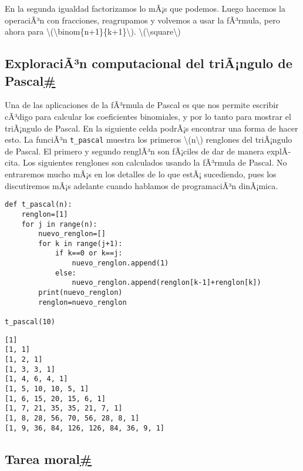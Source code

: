 \documentclass[
]{article}
\begin{document}
En la segunda igualdad factorizamos lo mÃ¡s que podemos. Luego hacemos
la operaciÃ³n con fracciones, reagrupamos y volvemos a usar la fÃ³rmula,
pero ahora para
{\textbackslash(\textbackslash binom\{n+1\}\{k+1\}\textbackslash)}.
{{\textbackslash(\textbackslash square\textbackslash)}}

\label{exploracion-computacional-del-triangulo-de-pascal}
\subsection{\texorpdfstring{ExploraciÃ³n computacional del triÃ¡ngulo de
Pascal\hyperref[exploracion-computacional-del-triangulo-de-pascal]{\#}}{ExploraciÃ³n computacional del triÃ¡ngulo de Pascal\#}}\label{exploraciuxe3uxb3n-computacional-del-triuxe3ngulo-de-pascal}

Una de las aplicaciones de la fÃ³rmula de Pascal es que nos permite
escribir cÃ³digo para calcular los coeficientes binomiales, y por lo
tanto para mostrar el triÃ¡ngulo de Pascal. En la siguiente celda
podrÃ¡s encontrar una forma de hacer esto. La funciÃ³n
{\texttt{t\_pascal}} muestra los primeros
{\textbackslash(n\textbackslash)} renglones del triÃ¡ngulo de Pascal. El
primero y segundo renglÃ³n son fÃ¡ciles de dar de manera explÃ­cita. Los
siguientes renglones son calculados usando la fÃ³rmula de Pascal. No
entraremos mucho mÃ¡s en los detalles de lo que estÃ¡ sucediendo, pues
los discutiremos mÃ¡s adelante cuando hablamos de programaciÃ³n
dinÃ¡mica.

\begin{verbatim}
def t_pascal(n):
    renglon=[1]
    for j in range(n):
        nuevo_renglon=[]
        for k in range(j+1):
            if k==0 or k==j:
                nuevo_renglon.append(1)
            else:
                nuevo_renglon.append(renglon[k-1]+renglon[k])
        print(nuevo_renglon)
        renglon=nuevo_renglon

t_pascal(10)
\end{verbatim}

\begin{verbatim}
[1]
[1, 1]
[1, 2, 1]
[1, 3, 3, 1]
[1, 4, 6, 4, 1]
[1, 5, 10, 10, 5, 1]
[1, 6, 15, 20, 15, 6, 1]
[1, 7, 21, 35, 35, 21, 7, 1]
[1, 8, 28, 56, 70, 56, 28, 8, 1]
[1, 9, 36, 84, 126, 126, 84, 36, 9, 1]
\end{verbatim}

\subsection{\texorpdfstring{Tarea
moral\hyperref[tarea-moral]{\#}}{Tarea moral\#}}\label{tarea-moral}
\end{document}
